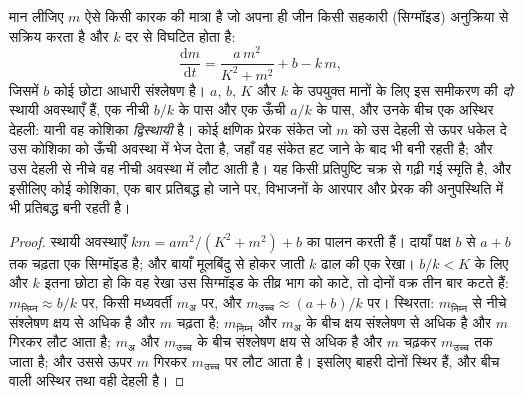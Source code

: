 \begin{theorem}[स्वयं को बनाए रखता एक स्विच]\label{thm:b2:cell-differentiation:switch}
मान लीजिए $m$ ऐसे किसी कारक की मात्रा है जो अपना ही जीन किसी
सहकारी (सिग्मॉइड) अनुक्रिया से सक्रिय करता है और $k$ दर से विघटित होता है:
\[
\frac{\mathrm{d}m}{\mathrm{d}t} = \frac{a\,m^{2}}{K^{2} + m^{2}} + b - k\,m,
\]
जिसमें $b$ कोई छोटा आधारी संश्लेषण है। $a$, $b$, $K$ और
$k$ के उपयुक्त मानों के लिए इस समीकरण की \emph{दो} स्थायी अवस्थाएँ हैं,
एक नीची $b/k$ के पास और एक ऊँची $a/k$ के पास, और उनके बीच एक अस्थिर
देहली: यानी वह कोशिका \emph{द्विस्थायी} है। कोई क्षणिक प्रेरक
संकेत जो $m$ को उस देहली से ऊपर धकेल दे उस कोशिका को ऊँची अवस्था में
भेज देता है, जहाँ वह संकेत हट जाने के बाद भी बनी रहती है; और उस देहली से
नीचे वह नीची अवस्था में लौट आती है। यह किसी प्रतिपुष्टि चक्र से गढ़ी गई
स्मृति है, और इसीलिए कोई कोशिका, एक बार प्रतिबद्ध हो जाने पर, विभाजनों
के आरपार और प्रेरक की अनुपस्थिति में भी प्रतिबद्ध बनी रहती है।
\end{theorem}
\begin{proof}
स्थायी अवस्थाएँ $k m = a m^{2}/(K^{2} + m^{2}) + b$ का पालन करती हैं।
दायाँ पक्ष $b$ से $a + b$ तक चढ़ता एक सिग्मॉइड है; और बायाँ
मूलबिंदु से होकर जाती $k$ ढाल की एक रेखा। $b/k < K$ के लिए और $k$ इतना
छोटा हो कि वह रेखा उस सिग्मॉइड के तीव्र भाग को काटे, तो दोनों
वक्र तीन बार कटते हैं: $m_{\text{निम्न}} \approx b/k$ पर, किसी
मध्यवर्ती $m_{\text{अ}}$ पर, और $m_{\text{उच्च}} \approx (a +
b)/k$ पर। स्थिरता: $m_{\text{निम्न}}$ से नीचे संश्लेषण क्षय से अधिक है और
$m$ चढ़ता है; $m_{\text{निम्न}}$ और $m_{\text{अ}}$ के बीच क्षय
संश्लेषण से अधिक है और $m$ गिरकर लौट आता है; $m_{\text{अ}}$ और
$m_{\text{उच्च}}$ के बीच संश्लेषण क्षय से अधिक है और $m$ चढ़कर
$m_{\text{उच्च}}$ तक जाता है; और उससे ऊपर $m$ गिरकर $m_{\text{उच्च}}$ पर लौट आता है।
इसलिए बाहरी दोनों स्थिर हैं, और बीच वाली अस्थिर तथा
वही देहली है।
\end{proof}

